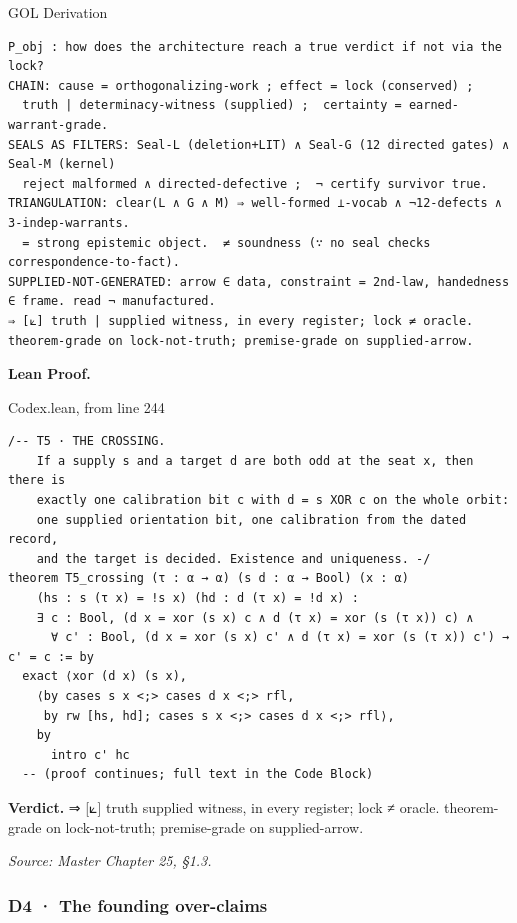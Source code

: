 \documentclass[10pt,twocolumn]{article}
\begin{document}
\begin{golbox}{GOL Derivation}
\begin{lstlisting}[style=golv]
P_obj : how does the architecture reach a true verdict if not via the lock?
CHAIN: cause = orthogonalizing-work ; effect = lock (conserved) ;
  truth | determinacy-witness (supplied) ;  certainty = earned-warrant-grade.
SEALS AS FILTERS: Seal-L (deletion+LIT) ∧ Seal-G (12 directed gates) ∧ Seal-M (kernel)
  reject malformed ∧ directed-defective ;  ¬ certify survivor true.
TRIANGULATION: clear(L ∧ G ∧ M) ⇒ well-formed ⊥-vocab ∧ ¬12-defects ∧ 3-indep-warrants.
  = strong epistemic object.  ≠ soundness (∵ no seal checks correspondence-to-fact).
SUPPLIED-NOT-GENERATED: arrow ∈ data, constraint = 2nd-law, handedness ∈ frame. read ¬ manufactured.
⇒ [⟀] truth | supplied witness, in every register; lock ≠ oracle. theorem-grade on lock-not-truth; premise-grade on supplied-arrow.
\end{lstlisting}
\end{golbox}

\textbf{Lean Proof.}

\begin{leanexcerpt}{Codex.lean, from line 244}
\begin{lstlisting}[style=leanx,firstnumber=244]
/-- T5 · THE CROSSING.
    If a supply s and a target d are both odd at the seat x, then there is
    exactly one calibration bit c with d = s XOR c on the whole orbit:
    one supplied orientation bit, one calibration from the dated record,
    and the target is decided. Existence and uniqueness. -/
theorem T5_crossing (τ : α → α) (s d : α → Bool) (x : α)
    (hs : s (τ x) = !s x) (hd : d (τ x) = !d x) :
    ∃ c : Bool, (d x = xor (s x) c ∧ d (τ x) = xor (s (τ x)) c) ∧
      ∀ c' : Bool, (d x = xor (s x) c' ∧ d (τ x) = xor (s (τ x)) c') → c' = c := by
  exact ⟨xor (d x) (s x),
    ⟨by cases s x <;> cases d x <;> rfl,
     by rw [hs, hd]; cases s x <;> cases d x <;> rfl⟩,
    by
      intro c' hc
  -- (proof continues; full text in the Code Block)
\end{lstlisting}
\end{leanexcerpt}

\textbf{Verdict.} ⇒ {[}⟀{]} truth \textbar{} supplied witness, in every
register; lock ≠ oracle. theorem-grade on lock-not-truth; premise-grade
on supplied-arrow.

\emph{Source: Master Chapter 25, §1.3.}

\hypertarget{d4-the-founding-over-claims}{%
\subsubsection{D4 · The founding
over-claims}\label{d4-the-founding-over-claims}}
\end{document}
